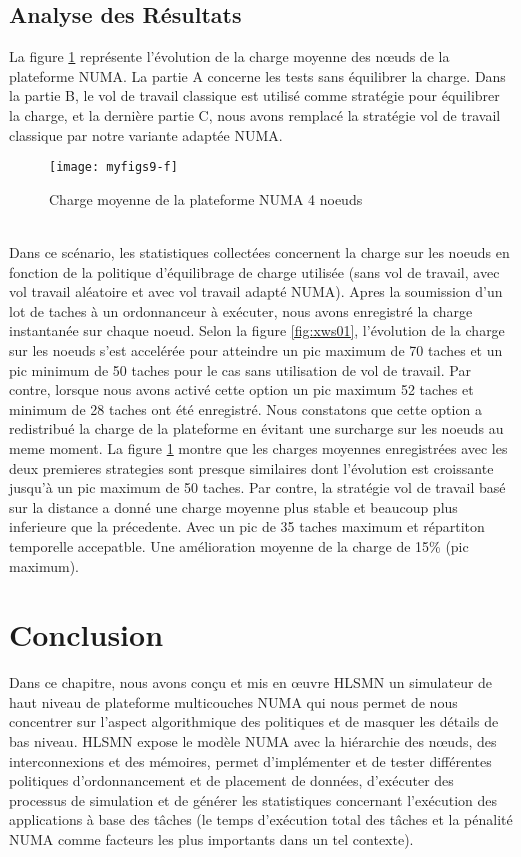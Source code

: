 \subsection{Analyse des Résultats}
%
La figure \ref{fig:fg101} représente l'évolution de la charge moyenne des nœuds de la plateforme NUMA. La partie A concerne les tests sans équilibrer la charge. Dans la partie B, le vol de travail classique est utilisé comme stratégie pour équilibrer la charge, et la dernière partie C, nous avons remplacé la stratégie vol de travail classique par notre variante adaptée NUMA.   
%
\begin{figure}[h!]
\texttt{[image: myfigs9-f]}
\centering
\caption{Charge moyenne de la plateforme NUMA 4 noeuds}
\label{fig:fg101}
\end{figure}
%
\\
Dans ce scénario, les statistiques collectées concernent la charge sur les noeuds en fonction de la politique d'équilibrage de charge  utilisée (sans vol de travail, avec vol travail aléatoire et avec vol travail adapté NUMA). Apres la soumission d'un lot de taches à un ordonnanceur à exécuter, nous avons enregistré la charge instantanée sur chaque noeud. Selon la figure \ref{fig:xws01}, l'évolution de la charge sur les noeuds s'est accelérée pour atteindre un pic maximum de 70 taches et un pic minimum de 50 taches pour le cas sans utilisation de vol de travail. Par contre, lorsque nous avons activé cette option un pic maximum 52 taches et minimum de 28 taches ont été enregistré. Nous constatons que cette option a redistribué la charge de la plateforme en évitant une surcharge sur les noeuds au meme moment. La figure \ref{fig:fg101} montre que les charges moyennes enregistrées avec les deux premieres strategies sont presque similaires dont l'évolution est croissante jusqu'à un pic maximum de 50 taches. Par contre, la stratégie vol de travail basé sur la distance a donné une charge moyenne plus stable et beaucoup plus inferieure que la précedente. Avec un pic de 35 taches maximum et répartiton temporelle accepatble. Une amélioration moyenne de la charge de 15\% (pic maximum).
\newpage
\section{Conclusion}\label{conc}
%
Dans ce chapitre, nous avons conçu et mis en œuvre HLSMN un simulateur de haut niveau de plateforme multicouches NUMA qui nous permet de nous concentrer sur l'aspect algorithmique des politiques et de masquer les détails de bas niveau. HLSMN expose le modèle NUMA avec la hiérarchie des nœuds, des interconnexions et des mémoires, permet d'implémenter et de tester différentes politiques d'ordonnancement et de placement de données, d'exécuter des processus de simulation et de générer les statistiques concernant l'exécution des applications à base des tâches (le temps d'exécution total des tâches et la pénalité NUMA comme facteurs les plus importants dans un tel contexte). 

